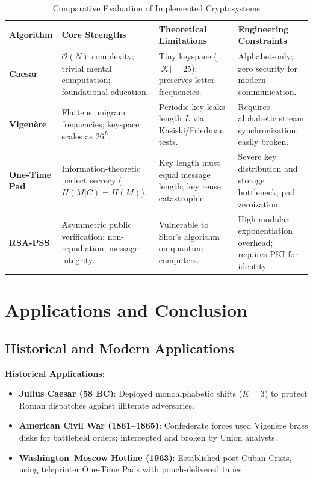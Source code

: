 \documentclass[12pt,a4paper]{report}
\begin{document}
\begin{table}[h!]
\centering
\footnotesize
\begin{tabularx}{\linewidth}{|l|X|X|X|}
\hline
\rowcolor{tableheader}
\textbf{Algorithm} & \textbf{Core Strengths} & \textbf{Theoretical Limitations} & \textbf{Engineering Constraints} \\
\hline
\textbf{Caesar} & $\mathcal{O}(N)$ complexity; trivial mental computation; foundational education. & Tiny keyspace ($|\mathcal{K}|=25$); preserves letter frequencies. & Alphabet-only; zero security for modern communication. \\
\hline
\textbf{Vigen\`ere} & Flattens unigram frequencies; keyspace scales as $26^L$. & Periodic key leaks length $L$ via Kasiski/Friedman tests. & Requires alphabetic stream synchronization; easily broken. \\
\hline
\textbf{One-Time Pad} & Information-theoretic perfect secrecy ($H(M|C) = H(M)$). & Key length must equal message length; key reuse catastrophic. & Severe key distribution and storage bottleneck; pad zeroization. \\
\hline
\textbf{RSA-PSS} & Asymmetric public verification; non-repudiation; message integrity. & Vulnerable to Shor's algorithm on quantum computers. & High modular exponentiation overhead; requires PKI for identity. \\
\hline
\end{tabularx}
\caption{Comparative Evaluation of Implemented Cryptosystems}
\label{tab:comp_eval}
\end{table}

\newpage

\chapter{Applications and Conclusion}

\section{Historical and Modern Applications}
\textbf{Historical Applications}:
\begin{itemize}[noitemsep,topsep=2pt]
    \item \textbf{Julius Caesar (58 BC)}: Deployed monoalphabetic shifts ($K=3$) to protect Roman dispatches against illiterate adversaries.
    \item \textbf{American Civil War (1861--1865)}: Confederate forces used Vigen\`ere brass disks for battlefield orders; intercepted and broken by Union analysts.
    \item \textbf{Washington--Moscow Hotline (1963)}: Established post-Cuban Crisis, using teleprinter One-Time Pads with pouch-delivered tapes.
\end{itemize}
\end{document}
